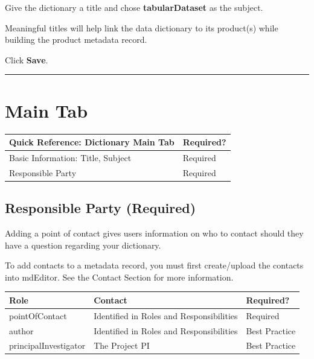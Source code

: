 \documentclass[
]{book}
\makeatletter
\newenvironment{kframe}{%
\medskip{}
\setlength{\fboxsep}{.8em}
 \def\at@end@of@kframe{}%
 \ifinner\ifhmode%
  \def\at@end@of@kframe{\end{minipage}}%
  \begin{minipage}{\columnwidth}%
 \fi\fi%
 \def\FrameCommand##1{\hskip\@totalleftmargin \hskip-\fboxsep
 \colorbox{shadecolor}{##1}\hskip-\fboxsep
     \hskip-\linewidth \hskip-\@totalleftmargin \hskip\columnwidth}%
 \MakeFramed {\advance\hsize-\width
   \@totalleftmargin\z@ \linewidth\hsize
   \@setminipage}}%
 {\par\unskip\endMakeFramed%
 \at@end@of@kframe}
\newenvironment{rmdblock}[1]
  {
  \begin{itemize}
  \renewcommand{\labelitemi}{
    \raisebox{-.7\height}[0pt][0pt]{
      {\setkeys{Gin}{width=3em,keepaspectratio}\texttt{[image: images/\#1]}}
    }
  }
  \setlength{\fboxsep}{1em}
  \begin{kframe}
  \item
  }
  {
  \end{kframe}
  \end{itemize}
  }
\newenvironment{rmdtip}
  {\begin{rmdblock}{tip}}
  {\end{rmdblock}}
\makeatother
\begin{document}
Give the dictionary a title and chose \textbf{tabularDataset} as the subject.

\begin{rmdtip}
Meaningful titles will help link the data dictionary to its product(s)
while building the product metadata record.
\end{rmdtip}

Click \textbf{Save}.

\begin{center}\rule{0.5\linewidth}{\linethickness}\end{center}

\hypertarget{main-tab}{%
\section*{Main Tab}\label{main-tab}}

\begin{longtable}[]{@{}ll@{}}
\toprule
Quick Reference: Dictionary Main Tab & Required?\tabularnewline
\midrule
\endhead
Basic Information: Title, Subject & Required\tabularnewline
Responsible Party & Required\tabularnewline
\bottomrule
\end{longtable}

\hypertarget{responsible-party-required}{%
\subsection*{Responsible Party (Required)}\label{responsible-party-required}}

Adding a point of contact gives users information on who to contact should they have a question regarding your dictionary.

\begin{rmdtip}
To add contacts to a metadata record, you must first create/upload the
contacts into mdEditor. See the Contact Section for more information.
\end{rmdtip}

\begin{longtable}[]{@{}lll@{}}
\toprule
Role & Contact & Required?\tabularnewline
\midrule
\endhead
pointOfContact & Identified in Roles and Responsibilities & Required\tabularnewline
author & Identified in Roles and Responsibilities & Best Practice\tabularnewline
principalInvestigator & The Project PI & Best Practice\tabularnewline
\bottomrule
\end{longtable}
\end{document}
